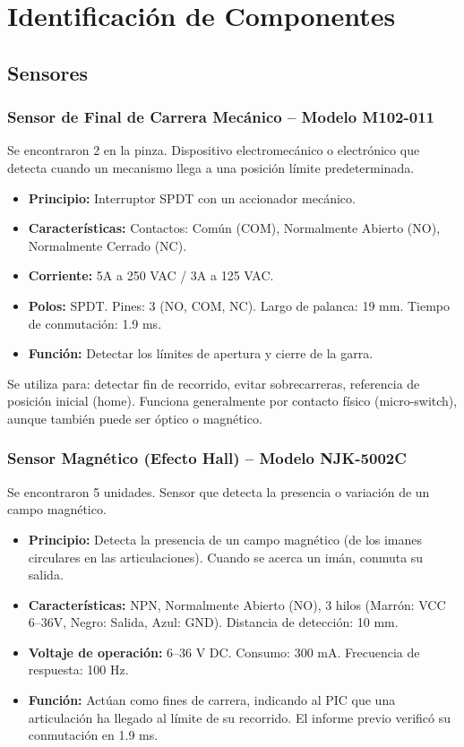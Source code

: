 \documentclass[11pt]{article}
\begin{document}
\section{Identificación de Componentes}

\subsection{Sensores}

\subsubsection{Sensor de Final de Carrera Mecánico – Modelo M102-011}

Se encontraron 2 en la pinza. Dispositivo electromecánico o electrónico que detecta cuando un mecanismo llega a una posición límite predeterminada.



\begin{itemize}
	\item \textbf{Principio:} Interruptor SPDT con un accionador mecánico.
	\item \textbf{Características:} Contactos: Común (COM), Normalmente Abierto (NO), Normalmente Cerrado (NC).
	\item \textbf{Corriente:} 5A a 250 VAC / 3A a 125 VAC.
	\item \textbf{Polos:} SPDT. Pines: 3 (NO, COM, NC). Largo de palanca: 19 mm. Tiempo de conmutación: 1.9 ms.
	\item \textbf{Función:} Detectar los límites de apertura y cierre de la garra.
\end{itemize}

Se utiliza para: detectar fin de recorrido, evitar sobrecarreras, referencia de posición inicial (home). Funciona generalmente por contacto físico (micro-switch), aunque también puede ser óptico o magnético.

\subsubsection{Sensor Magnético (Efecto Hall) – Modelo NJK-5002C}

Se encontraron 5 unidades. Sensor que detecta la presencia o variación de un campo magnético.

\begin{itemize}
	\item \textbf{Principio:} Detecta la presencia de un campo magnético (de los imanes circulares en las articulaciones). Cuando se acerca un imán, conmuta su salida.
	\item \textbf{Características:} NPN, Normalmente Abierto (NO), 3 hilos (Marrón: VCC 6–36V, Negro: Salida, Azul: GND). Distancia de detección: 10 mm.
	\item \textbf{Voltaje de operación:} 6–36 V DC. Consumo: 300 mA. Frecuencia de respuesta: 100 Hz.
	\item \textbf{Función:} Actúan como fines de carrera, indicando al PIC que una articulación ha llegado al límite de su recorrido. El informe previo verificó su conmutación en 1.9 ms.
\end{itemize}
\end{document}
